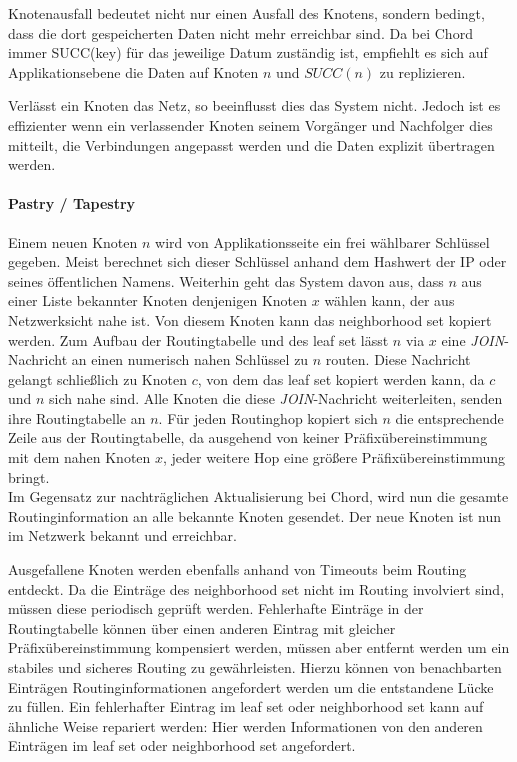 Knotenausfall bedeutet nicht nur einen Ausfall des Knotens, sondern bedingt, dass die dort gespeicherten Daten nicht mehr erreichbar sind. Da bei Chord immer SUCC(key) für das jeweilige Datum zuständig ist, empfiehlt es sich auf Applikationsebene die Daten auf Knoten $n$ und $SUCC(n)$ zu replizieren.

Verlässt ein Knoten das Netz, so beeinflusst dies das System nicht. Jedoch ist es effizienter wenn ein verlassender Knoten seinem Vorgänger und Nachfolger dies mitteilt, die Verbindungen angepasst werden und die Daten explizit übertragen werden.

\paragraph{Pastry / Tapestry}
Einem neuen Knoten $n$ wird von Applikationsseite ein frei wählbarer Schlüssel gegeben. Meist berechnet sich dieser Schlüssel anhand dem Hashwert der IP oder seines öffentlichen Namens. Weiterhin geht das System davon aus, dass $n$ aus einer Liste bekannter Knoten denjenigen Knoten $x$ wählen kann, der aus Netzwerksicht nahe ist. Von diesem Knoten kann das neighborhood set kopiert werden. Zum Aufbau der Routingtabelle und des leaf set lässt $n$ via $x$ eine \emph{JOIN}-Nachricht an einen numerisch nahen Schlüssel zu $n$ routen. Diese Nachricht gelangt schließlich zu Knoten $c$, von dem das leaf set kopiert werden kann, da $c$ und $n$ sich nahe sind. Alle Knoten die diese \emph{JOIN}-Nachricht weiterleiten, senden ihre Routingtabelle an $n$. Für jeden Routinghop kopiert sich $n$ die entsprechende Zeile aus der Routingtabelle, da ausgehend von keiner Präfixübereinstimmung mit dem nahen Knoten $x$, jeder weitere Hop eine größere Präfixübereinstimmung bringt.\\
Im Gegensatz zur nachträglichen Aktualisierung bei Chord, wird nun die gesamte Routinginformation an alle bekannte Knoten gesendet. Der neue Knoten ist nun im Netzwerk bekannt und erreichbar.

Ausgefallene Knoten werden ebenfalls anhand von Timeouts beim Routing entdeckt. Da die Einträge des neighborhood set nicht im Routing involviert sind, müssen diese periodisch geprüft werden. Fehlerhafte Einträge in der Routingtabelle können über einen anderen Eintrag mit gleicher Präfixübereinstimmung kompensiert werden, müssen aber entfernt werden um ein stabiles und sicheres Routing zu gewährleisten. Hierzu können von benachbarten Einträgen Routinginformationen angefordert werden um die entstandene Lücke zu füllen. Ein fehlerhafter Eintrag im leaf set oder neighborhood set kann auf ähnliche Weise repariert werden: Hier werden Informationen von den anderen Einträgen im leaf set oder neighborhood set angefordert.

